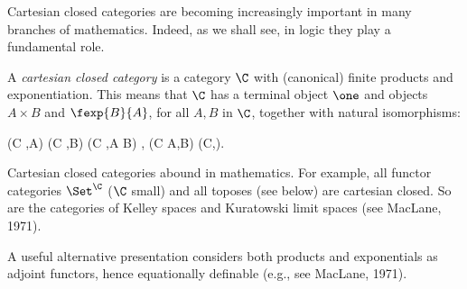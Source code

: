 Cartesian closed categories are becoming increasingly important in many
branches of mathematics. Indeed, as we shall see, in logic they play a fundamental
role.

A {\em cartesian closed category} is a category $\C$ with (canonical) finite
products and exponentiation. This means that $\C$ has a terminal object $\one$ and
objects $A \times B$ and $\fexp{B}{A}$, for all $A,B$ in $\C$, together
with natural isomorphisms:

\bes
\Hom(C ,A) \times \Hom(C ,B)  \iso \Hom(C ,A \times B) ,
\ees
\bes
\Hom(C \times A,B) \iso \Hom(C,).
\ees

Cartesian closed categories abound in mathematics. For example, all
functor categories $\Set^{\C}$ ($\C$ small) and all toposes (see below) are cartesian
closed. So are the categories of Kelley spaces and Kuratowski limit spaces
(see MacLane, 1971).

A useful alternative presentation considers both products and exponentials
as adjoint functors, hence equationally definable (e.g., see MacLane, 1971).

\def\deq{\mathop{\cdot\mkern-5mu=\mkern-5mu\cdot}}

